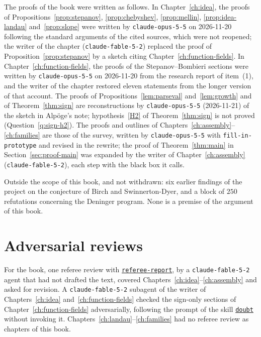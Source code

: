 \documentclass[11pt]{amsbook}
\theoremstyle{plain}
\theoremstyle{definition}
\theoremstyle{remark}
\numberwithin{equation}{section}
\numberwithin{figure}{chapter}
\numberwithin{table}{chapter}
\newcommand{\vtwoskillurl}{https://github.com/tdupu/%
agent-skills-public/blob/8d13efb5e66306aeae6e3b948bc463e7e2db1b65}
\newcommand{\vtwoskill}[1]{%
\href{\vtwoskillurl/skills/#1/SKILL.md}{\texttt{#1}}}
\begin{document}
The proofs of the book were written as follows. In
Chapter~\ref{ch:idea}, the proofs of
Propositions~\ref{prop:stepanov}, \ref{prop:chebyshev},
\ref{prop:mellin}, \ref{prop:idea-landau} and~\ref{prop:slope} were
written by \texttt{claude-opus-5-5} on 2026-11-20 following the
standard arguments of the cited sources, which were not reopened; the
writer of the chapter (\texttt{claude-fable-5-2}) replaced the proof of
Proposition~\ref{prop:stepanov} by a sketch citing
Chapter~\ref{ch:function-fields}. In Chapter~\ref{ch:function-fields},
the proofs of the Stepanov--Bombieri sections were written by
\texttt{claude-opus-5-5} on 2026-11-20 from the research report of
item~(1), and the writer of the chapter restored eleven statements from
the longer version of that account. The proofs of
Propositions~\ref{lem:parseval} and~\ref{lem:growth} and of
Theorem~\ref{thm:sign} are reconstructions by \texttt{claude-opus-5-5}
(2026-11-21) of the sketch in Alp\"oge's note; hypothesis~\ref{H2} of
Theorem~\ref{thm:sign} is not proved (Question~\ref{q:sign-h2}). The
proofs and outlines of Chapters~\ref{ch:assembly}--\ref{ch:families}
are those of the survey, written by \texttt{claude-opus-5-5} with
\texttt{fill-in-prototype} and revised in the rewrite; the proof of
Theorem~\ref{thm:main} in Section~\ref{sec:proof-main} was expanded by
the writer of Chapter~\ref{ch:assembly} (\texttt{claude-fable-5-2}),
each step with the black box it calls.

Outside the scope of this book, and not withdrawn: six earlier
findings of the project on the conjecture of Birch and
Swinnerton-Dyer, and a block of $250$ refutations concerning the
Deninger program. None is a premise of the argument of this book.

\section{Adversarial reviews}
\label{sec:ai-reviews}
For the book, one referee review with \vtwoskill{referee-report}, by
a \texttt{claude-fable-5-2} agent that had not drafted the text,
covered Chapters~\ref{ch:idea}--\ref{ch:assembly} and asked for
revision. A \texttt{claude-fable-5-2} subagent of the writer of
Chapters~\ref{ch:idea} and~\ref{ch:function-fields} checked the
sign-only sections of Chapter~\ref{ch:function-fields} adversarially,
following the prompt of the skill \vtwoskill{doubt} without invoking
it. Chapters~\ref{ch:landau}--\ref{ch:families} had no referee review
as chapters of this book.
\end{document}
